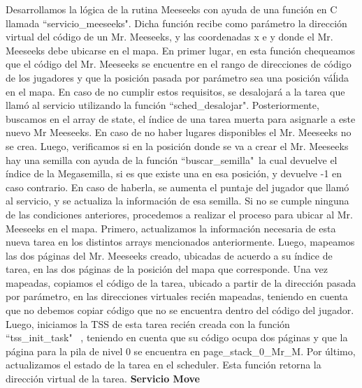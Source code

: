 \documentclass[a4paper]{article}
\begin{document}
Desarrollamos la lógica de la rutina Meeseeks con ayuda de una función en C llamada ``servicio_meeseeks". Dicha función recibe como parámetro la dirección virtual del código de un Mr. Meeseeks, y las coordenadas x e y donde el Mr. Meeseeks debe ubicarse en el mapa. En primer lugar, en esta función chequeamos que el código del Mr. Meeseeks se encuentre en el rango de direcciones de código de los jugadores y que la posición pasada por parámetro sea una posición váĺida en el mapa. En caso de no cumplir estos requisitos, se desalojará a la tarea que llamó al servicio utilizando la función ``sched_desalojar". Posteriormente, buscamos en el array de state, el índice de una tarea muerta para asignarle a este nuevo Mr Meeseeks. En caso de no haber lugares disponibles el Mr. Meeseeks no se crea. Luego, verificamos si en la posición donde se va a crear el Mr. Meeseeks hay una semilla con ayuda de la función ``buscar_semilla"\, la cual devuelve el índice de la Megasemilla, si es que existe una en esa posición, y devuelve -1 en caso contrario. En caso de haberla, se aumenta el puntaje del jugador que llamó al servicio, y se actualiza la información de esa semilla. Si no se cumple ninguna de las condiciones anteriores, procedemos a realizar el proceso para ubicar al Mr. Meeseeks en el mapa. Primero, actualizamos la información necesaria de esta nueva tarea en los distintos arrays mencionados anteriormente. Luego, mapeamos las dos páginas del Mr. Meeseeks creado, ubicadas de acuerdo a su índice de tarea, en las dos páginas de la posición del mapa que corresponde. Una vez mapeadas, copiamos el código de la tarea, ubicado a partir de la dirección pasada por parámetro, en las direcciones virtuales recién mapeadas, teniendo en cuenta que no debemos copiar código que no se encuentra dentro del código del jugador. Luego, iniciamos la TSS de esta tarea recién creada con la función ``tss_init_task" \ , teniendo en cuenta que su código ocupa dos páginas y que la página para la pila de nivel 0 se encuentra en page_stack_0_Mr_M. Por último, actualizamos el estado de la tarea en el scheduler. Esta función retorna la dirección virtual de la tarea.
\justify
\textbf{Servicio Move}
\justify
\end{document}
